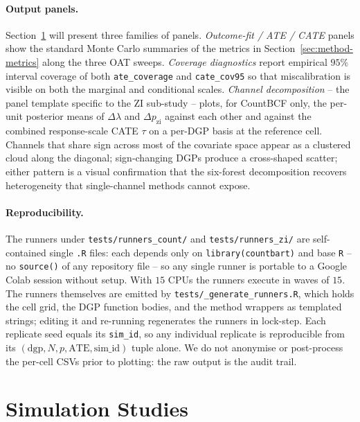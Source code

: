 \documentclass[11pt]{article}
\theoremstyle{plain}
\theoremstyle{definition}
\theoremstyle{remark}
\newcommand{\tauresp}{\tau}                 %
\newcommand{\Deltalam}{\Delta\lambda}
\newcommand{\Deltapzi}{\Delta p_{\mathrm{zi}}}
\begin{document}
\paragraph{Output panels.}
Section~\ref{sec:empirical} will present three families of panels.
\emph{Outcome-fit / ATE / CATE} panels show the standard Monte Carlo
summaries of the metrics in Section~\ref{sec:method-metrics} along
the three OAT sweeps. \emph{Coverage diagnostics} report empirical
$95\%$ interval coverage of both \verb|ate_coverage| and
\verb|cate_cov95| so that miscalibration is visible on both the
marginal and conditional scales. \emph{Channel decomposition} -- the
panel template specific to the ZI sub-study -- plots, for CountBCF
only, the per-unit posterior means of $\Deltalam$ and $\Deltapzi$
against each other and against the combined response-scale CATE
$\tauresp$ on a per-DGP basis at the reference cell. Channels that
share sign across most of the covariate space appear as a clustered
cloud along the diagonal; sign-changing DGPs produce a cross-shaped
scatter; either pattern is a visual confirmation that the six-forest
decomposition recovers heterogeneity that single-channel methods
cannot expose.

\paragraph{Reproducibility.}
The runners under \verb|tests/runners_count/| and
\verb|tests/runners_zi/| are self-contained single \verb|.R| files:
each depends only on \verb|library(countbart)| and base \verb|R| --
no \verb|source()| of any repository file -- so any single runner is
portable to a Google Colab session without setup. With $15$ CPUs the
runners execute in waves of $15$. The runners themselves are emitted
by \verb|tests/_generate_runners.R|, which holds the cell grid, the
DGP function bodies, and the method wrappers as templated strings;
editing it and re-running regenerates the runners in lock-step. Each
replicate seed equals its \verb|sim_id|, so any individual replicate
is reproducible from its
$(\text{dgp}, N, p, \text{ATE}, \text{sim\_id})$ tuple alone. We do
not anonymise or post-process the per-cell CSVs prior to plotting:
the raw output is the audit trail.

\section{Simulation Studies}\label{sec:empirical}
\end{document}

